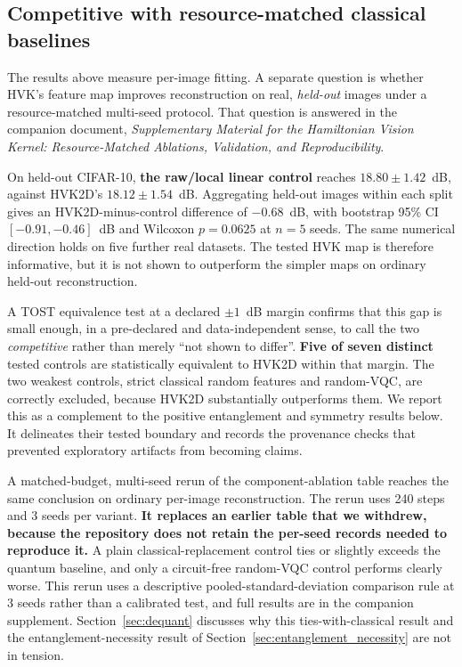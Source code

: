 \documentclass[pdflatex,sn-basic]{sn-jnl}
\newcommand{\snew}[1]{\textbf{\textcolor{studentgreen}{#1}}}
\begin{document}
\color{black}

\subsection{Competitive with resource-matched classical baselines}
\label{sec:ablation_relationship}
\color{green}
The results above measure per-image fitting. A separate question is whether
HVK's feature map improves reconstruction on real, \emph{held-out} images under
a resource-matched multi-seed protocol. That question is answered in the
companion document, \textit{Supplementary Material for the Hamiltonian Vision
Kernel: Resource-Matched Ablations, Validation, and Reproducibility}.

On held-out CIFAR-10, \snew{the raw/local linear control} reaches
$18.80\pm1.42$~dB, against HVK2D's $18.12\pm1.54$~dB. Aggregating held-out
images within each split gives an HVK2D-minus-control difference of $-0.68$~dB,
with bootstrap 95\% CI $[-0.91,-0.46]$~dB and Wilcoxon $p=0.0625$ at $n=5$
seeds. The same numerical direction holds on five further real datasets. The
tested HVK map is therefore informative, but it is not shown to outperform the
simpler maps on ordinary held-out reconstruction.

A TOST equivalence test at a declared $\pm1$~dB margin confirms that this gap is
small enough, in a pre-declared and data-independent sense, to call the two
\emph{competitive} rather than merely ``not shown to differ''.
\snew{Five of seven distinct} tested controls are statistically equivalent to
HVK2D within that margin. The two weakest controls, strict classical random
features and random-VQC, are correctly excluded, because HVK2D substantially
outperforms them. We report this as a complement to the positive entanglement
and symmetry results below. It delineates their tested boundary and records the
provenance checks that prevented exploratory artifacts from becoming claims.

A matched-budget, multi-seed rerun of the component-ablation table reaches the
same conclusion on ordinary per-image reconstruction. The rerun uses 240 steps
and 3 seeds per variant. {\color{red}\textbf{It replaces an earlier table that
we withdrew, because the repository does not retain the per-seed records needed
to reproduce it.}} A plain classical-replacement control ties or slightly
exceeds the quantum baseline, and only a circuit-free random-VQC control
performs clearly worse. This rerun uses a descriptive pooled-standard-deviation
comparison rule at 3 seeds rather than a calibrated test, and full results are in
the companion supplement. Section~\ref{sec:dequant} discusses why this
ties-with-classical result and the entanglement-necessity result of
Section~\ref{sec:entanglement_necessity} are not in tension.
\end{document}
